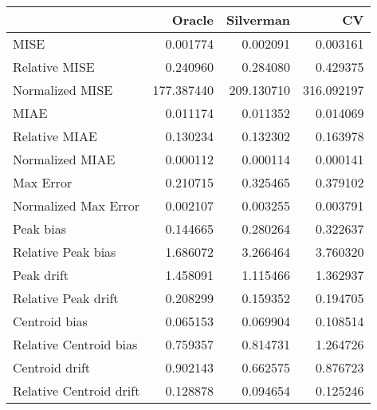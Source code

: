 \begin{tabular}{lrrr}
  \hline
 & Oracle & Silverman & CV \\ 
  \hline
MISE & 0.001774 & 0.002091 & 0.003161 \\ 
  Relative MISE & 0.240960 & 0.284080 & 0.429375 \\ 
  Normalized MISE & 177.387440 & 209.130710 & 316.092197 \\ 
  MIAE & 0.011174 & 0.011352 & 0.014069 \\ 
  Relative MIAE & 0.130234 & 0.132302 & 0.163978 \\ 
  Normalized MIAE & 0.000112 & 0.000114 & 0.000141 \\ 
  Max Error & 0.210715 & 0.325465 & 0.379102 \\ 
  Normalized Max Error & 0.002107 & 0.003255 & 0.003791 \\ 
  Peak bias & 0.144665 & 0.280264 & 0.322637 \\ 
  Relative Peak bias & 1.686072 & 3.266464 & 3.760320 \\ 
  Peak drift & 1.458091 & 1.115466 & 1.362937 \\ 
  Relative Peak drift & 0.208299 & 0.159352 & 0.194705 \\ 
  Centroid bias & 0.065153 & 0.069904 & 0.108514 \\ 
  Relative Centroid bias & 0.759357 & 0.814731 & 1.264726 \\ 
  Centroid drift & 0.902143 & 0.662575 & 0.876723 \\ 
  Relative Centroid drift & 0.128878 & 0.094654 & 0.125246 \\ 
   \hline
\end{tabular}
